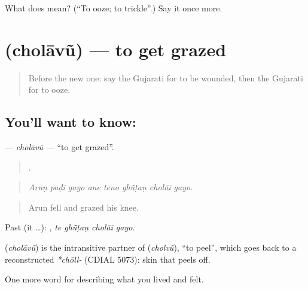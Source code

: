 \begin{tcolorbox}[breakable,colback=teal!4,colframe=teal!35!black,title={Before you move on}]
What does  mean? (\textquotedblleft{}To ooze; to trickle\textquotedblright{}.) Say it once more.
\end{tcolorbox}
\section[\texorpdfstring{\gu{છોલાવું} (cholāvũ)}{છોલાવું (cholāvũ)}]{ (cholāvũ) — to get grazed}

\label{lesson:GU-C481-cholavu}



\begin{quote}
Before the new one: say the Gujarati for to be wounded, then the Gujarati for to ooze.
\end{quote}

\subsection*{You'll want to know: }
\textbf{} — \emph{cholāvũ} — \textquotedblleft{}to get grazed\textquotedblright{}.

\begin{quote}
       .
\end{quote}

\begin{quote}
\emph{Aruṇ paḍī gayo ane teno ghū̃ṭaṇ cholāī gayo.}
\end{quote}

\begin{quote}
Arun fell and grazed his knee.
\end{quote}

Past (it …):    , \emph{te ghū̃ṭaṇ cholāī gayo}.

\begin{cousinweb}
\textbf{} (\emph{cholāvũ}) is the intransitive partner of \textbf{} (\emph{cholvũ}), \textquotedblleft{}to peel\textquotedblright{}, which goes back to a reconstructed \emph{*chōll-} (CDIAL 5073): skin that peels off.
\end{cousinweb}

\begin{grammarlens}[title={What you've built}]
One more word for describing what you lived and felt.
\end{grammarlens}

